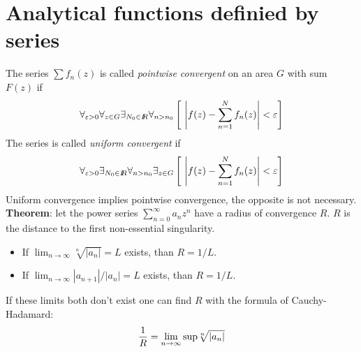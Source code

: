 \documentclass[twoside]{report}
\begin{document}
\section{Analytical functions definied by series}
The series $\sum f_n(z)$ is called {\it pointwise convergent} on an area $G$
with sum $F(z)$ if
\[
\forall_{\varepsilon>0}\forall_{z\in G}\exists_{N_0\in I\hspace{-1mm}R}\forall_{n>n_0}
\left[~\left|f(z)-\sum_{n=1}^Nf_n(z)\right|<\varepsilon\right]
\]
The series is called {\it uniform convergent} if
\[
\forall_{\varepsilon>0}\exists_{N_0\in I\hspace{-1mm}R}\forall_{n>n_0}\exists_{z\in G}
\left[~\left|f(z)-\sum_{n=1}^Nf_n(z)\right|<\varepsilon\right]
\]
Uniform convergence implies pointwise convergence, the opposite is not
necessary.
\npar
{\bf Theorem}: let the power series $\sum\limits_{n=0}^\infty a_nz^n$ have
a radius of convergence $R$. $R$ is the distance to the first non-essential
singularity.
\begin{itemize}
\item If $\displaystyle\lim_{n\rightarrow\infty}\sqrt[n]{|a_n|}=L$ exists, than $R=1/L$.
\item If $\displaystyle\lim_{n\rightarrow\infty}|a_{n+1}|/|a_n|=L$ exists, than $R=1/L$.
\end{itemize}
If these limits both don't exist one can find $R$ with the formula of
Cauchy-Hadamard:
\[
\frac{1}{R}=\lim_{n\rightarrow\infty}{\rm sup}\sqrt[n]{|a_n|}
\]
\end{document}
